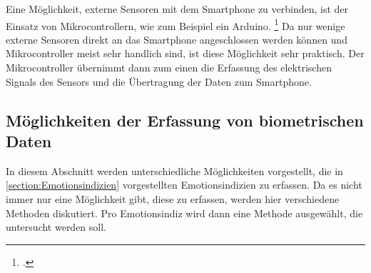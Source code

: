 Eine Möglichkeit, externe Sensoren mit dem Smartphone zu verbinden, ist der Einsatz von Mikrocontrollern, wie zum Beispiel ein Arduino. \footcite[Arduino UNO R3 Mikrocontroller: ][]{Ard18} Da nur wenige externe Sensoren direkt an das Smartphone angeschlossen werden können und Mikrocontroller meist sehr handlich sind, ist diese Möglichkeit sehr praktisch. Der Mikrocontroller übernimmt dann zum einen die Erfassung des elektrischen Signals des Sensors und die Übertragung der Daten zum Smartphone. 
\subsection{Möglichkeiten der Erfassung von biometrischen Daten} 
In diesem Abschnitt werden unterschiedliche Möglichkeiten vorgestellt, die in \ref{section:Emotionsindizien} vorgestellten Emotionsindizien zu erfassen. Da es nicht immer nur eine Möglichkeit gibt, diese zu erfassen, werden hier verschiedene Methoden diskutiert. Pro Emotionsindiz wird dann eine Methode ausgewählt, die untersucht werden soll.  
